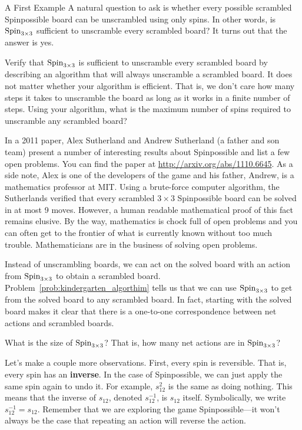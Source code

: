 \begin{section}{A First Example}
A natural question to ask is whether every possible scrambled Spinpossible board can be unscrambled using only spins.  In other words, is $\operatorname{Spin}_{3\times 3}$ sufficient to unscramble every scrambled board? It turns out that the answer is yes.

\begin{problem}\label{prob:kindergarten_algorthim}
Verify that $\operatorname{Spin}_{3\times 3}$ is sufficient to unscramble every scrambled board by describing an algorithm that will always unscramble a scrambled board.  It does not matter whether your algorithm is efficient.  That is, we don't care how many steps it takes to unscramble the board as long as it works in a finite number of steps.  Using your algorithm, what is the maximum number of spins required to unscramble any scrambled board?
\end{problem}

In a 2011 paper, Alex Sutherland and Andrew Sutherland (a father and son team) present a number of interesting results about Spinpossible and list a few open problems. You can find the paper at \url{http://arxiv.org/abs/1110.6645}. As a side note, Alex is one of the developers of the game and his father, Andrew, is a mathematics professor at MIT. Using a brute-force computer algorithm, the Sutherlands verified that every scrambled $3\times 3$ Spinpossible board can be solved in at most 9 moves. However, a human readable mathematical proof of this fact remains elusive.  By the way, mathematics is chock full of open problems and you can often get to the frontier of what is currently known without too much trouble.  Mathematicians are in the business of solving open problems.

Instead of unscrambling boards, we can act on the solved board with an action from $\operatorname{Spin}_{3\times 3}$ to obtain a scrambled board.  Problem~\ref{prob:kindergarten_algorthim} tells us that we can use $\operatorname{Spin}_{3\times 3}$ to get from the solved board to any scrambled board. In fact, starting with the solved board makes it clear that there is a one-to-one correspondence between net actions and scrambled boards.

\begin{problem}
What is the size of $\operatorname{Spin}_{3\times 3}$? That is, how many net actions are in $\operatorname{Spin}_{3\times 3}$?
\end{problem}

Let's make a couple more observations.  First, every spin is reversible. That is, every spin has an \textbf{inverse}.  In the case of Spinpossible, we can just apply the same spin again to undo it.  For example, $s_{12}^2$ is the same as doing nothing. This means that the inverse of $s_{12}$, denoted $s_{12}^{-1}$, is $s_{12}$ itself. Symbolically, we write $s_{12}^{-1}=s_{12}$. Remember that we are exploring the game Spinpossible---it won't always be the case that repeating an action will reverse the action. 


\end{section}
